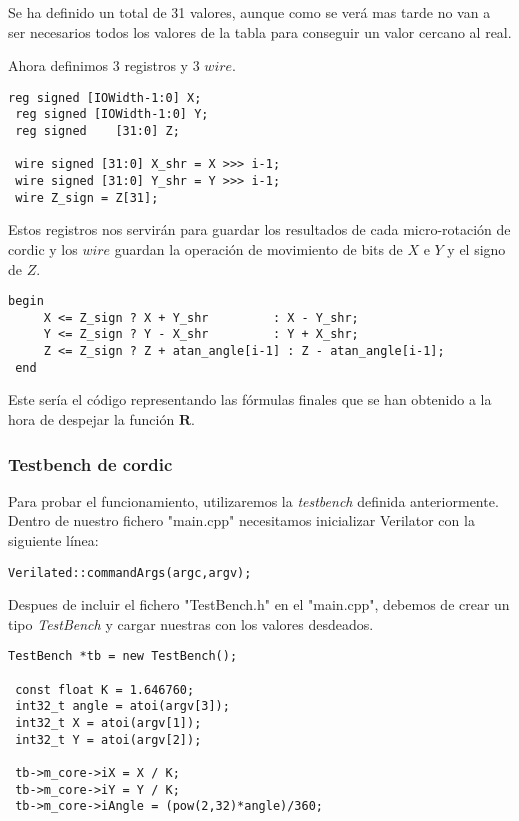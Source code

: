 Se ha definido un total de 31 valores, aunque como se verá mas tarde no van a ser necesarios todos los valores de la tabla para conseguir un valor cercano al real.

Ahora definimos 3 registros y 3 $wire$.

\begin{lstlisting}[caption={Registros y $wire$ para operar con \gls{cordic}}]
 reg signed [IOWidth-1:0] X;
 reg signed [IOWidth-1:0] Y;
 reg signed    [31:0] Z; 
 
 wire signed [31:0] X_shr = X >>> i-1;
 wire signed [31:0] Y_shr = Y >>> i-1;
 wire Z_sign = Z[31];  
\end{lstlisting}

Estos registros nos servirán para guardar los resultados de cada micro-rotación de \gls{cordic} y los $wire$ guardan la operación de movimiento de bits de $X$ e $Y$ y el signo de $Z$.

\begin{lstlisting}[caption={Bucle principal de \gls{cordic}}]
 begin
     X <= Z_sign ? X + Y_shr         : X - Y_shr;
     Y <= Z_sign ? Y - X_shr         : Y + X_shr;
     Z <= Z_sign ? Z + atan_angle[i-1] : Z - atan_angle[i-1];
 end
\end{lstlisting}

Este sería el código representando las fórmulas finales que se han obtenido a la hora de despejar la función $\textbf{R}$.

\subsubsection{Testbench de \gls{cordic}}
Para probar el funcionamiento, utilizaremos la \textit{testbench} definida anteriormente. Dentro de nuestro fichero "main.cpp" necesitamos inicializar Verilator con la siguiente línea:

\begin{lstlisting}
Verilated::commandArgs(argc,argv);
\end{lstlisting}

Despues de incluir el fichero "TestBench.h" en el "main.cpp", debemos de crear un tipo \textit{TestBench} y cargar nuestras con los valores desdeados.

\begin{lstlisting}[caption={Creación del tipo TestBench y entrada de valores desde C++ al módulo de \gls{cordic} en Verilog}]
 TestBench *tb = new TestBench();

 const float K = 1.646760;
 int32_t angle = atoi(argv[3]);
 int32_t X = atoi(argv[1]);
 int32_t Y = atoi(argv[2]);

 tb->m_core->iX = X / K;
 tb->m_core->iY = Y / K;
 tb->m_core->iAngle = (pow(2,32)*angle)/360;
\end{lstlisting} 

